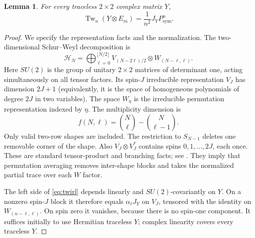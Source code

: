 \documentclass[11pt,a4paper]{article}
\newtheorem{lemma}[theorem]{Lemma}
\theoremstyle{remark}\newtheorem{remark}[theorem]{Remark}
\DeclareMathOperator{\Tw}{Tw}
\newcommand{\HH}{\mathcal H}
\newcommand{\Ps}{P_{\mathrm{sym}}}
\newcommand{\bin}[2]{\binom{#1}{#2}}
\begin{document}
\begin{lemma}\label{lem:twirl}
For every traceless $2\times2$ complex matrix $Y$,
\begin{equation}\label{eq:twirl}
 \Tw_n(Y\otimes E_m)=\frac1{n^2}J_Y\Ps^n.
\end{equation}
\end{lemma}
\begin{proof}
We specify the representation facts and the normalization. The two-dimensional Schur--Weyl decomposition is
\[
 \HH_N=\bigoplus_{\ell=0}^{\lfloor N/2\rfloor}
       V_{(N-2\ell)/2}\otimes W_{(N-\ell,\ell)}.
\]
Here $SU(2)$ is the group of unitary $2\times2$ matrices of determinant one, acting simultaneously on all tensor factors. Its spin-$J$ irreducible representation $V_J$ has dimension $2J+1$ (equivalently, it is the space of homogeneous polynomials of degree $2J$ in two variables). The space $W_\eta$ is the irreducible permutation representation indexed by $\eta$. The multiplicity dimension is
\[
 f(N,\ell)=\bin N\ell-\bin N{\ell-1}.
\]
Only valid two-row shapes are included. The restriction to $S_{N-1}$ deletes one removable corner of the shape. Also $V_J\otimes V_J^*$ contains spins $0,1,\ldots,2J$, each once. These are standard tensor-product and branching facts; see \cite[Sections II--IV]{bch}. They imply that permutation averaging removes inter-shape blocks and takes the normalized partial trace over each $W$ factor.

The left side of \eqref{eq:twirl} depends linearly and $SU(2)$-covariantly on $Y$. On a nonzero spin-$J$ block it therefore equals $\alpha_\ell J_Y$ on $V_J$, tensored with the identity on $W_{(n-\ell,\ell)}$. On spin zero it vanishes, because there is no spin-one component. It suffices initially to use Hermitian traceless $Y$; complex linearity covers every traceless $Y$.


\end{proof}
\end{document}
